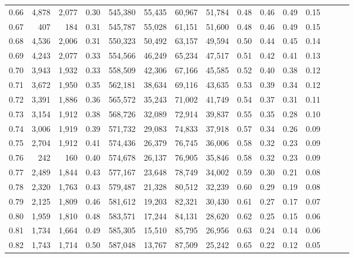 \begin{tabular}{rrrrrrrrrrrrrrr}
0.66 &   4,878 &  2,077 &  0.30 &  545,380 &   55,435 &   60,967 &   51,784 &  0.48 &  0.46 &  0.49 &      0.15 \\
0.67 &     407 &    184 &  0.31 &  545,787 &   55,028 &   61,151 &   51,600 &  0.48 &  0.46 &  0.49 &      0.15 \\
0.68 &   4,536 &  2,006 &  0.31 &  550,323 &   50,492 &   63,157 &   49,594 &  0.50 &  0.44 &  0.45 &      0.14 \\
0.69 &   4,243 &  2,077 &  0.33 &  554,566 &   46,249 &   65,234 &   47,517 &  0.51 &  0.42 &  0.41 &      0.13 \\
0.70 &   3,943 &  1,932 &  0.33 &  558,509 &   42,306 &   67,166 &   45,585 &  0.52 &  0.40 &  0.38 &      0.12 \\
0.71 &   3,672 &  1,950 &  0.35 &  562,181 &   38,634 &   69,116 &   43,635 &  0.53 &  0.39 &  0.34 &      0.12 \\
0.72 &   3,391 &  1,886 &  0.36 &  565,572 &   35,243 &   71,002 &   41,749 &  0.54 &  0.37 &  0.31 &      0.11 \\
0.73 &   3,154 &  1,912 &  0.38 &  568,726 &   32,089 &   72,914 &   39,837 &  0.55 &  0.35 &  0.28 &      0.10 \\
0.74 &   3,006 &  1,919 &  0.39 &  571,732 &   29,083 &   74,833 &   37,918 &  0.57 &  0.34 &  0.26 &      0.09 \\
0.75 &   2,704 &  1,912 &  0.41 &  574,436 &   26,379 &   76,745 &   36,006 &  0.58 &  0.32 &  0.23 &      0.09 \\
0.76 &     242 &    160 &  0.40 &  574,678 &   26,137 &   76,905 &   35,846 &  0.58 &  0.32 &  0.23 &      0.09 \\
0.77 &   2,489 &  1,844 &  0.43 &  577,167 &   23,648 &   78,749 &   34,002 &  0.59 &  0.30 &  0.21 &      0.08 \\
0.78 &   2,320 &  1,763 &  0.43 &  579,487 &   21,328 &   80,512 &   32,239 &  0.60 &  0.29 &  0.19 &      0.08 \\
0.79 &   2,125 &  1,809 &  0.46 &  581,612 &   19,203 &   82,321 &   30,430 &  0.61 &  0.27 &  0.17 &      0.07 \\
0.80 &   1,959 &  1,810 &  0.48 &  583,571 &   17,244 &   84,131 &   28,620 &  0.62 &  0.25 &  0.15 &      0.06 \\
0.81 &   1,734 &  1,664 &  0.49 &  585,305 &   15,510 &   85,795 &   26,956 &  0.63 &  0.24 &  0.14 &      0.06 \\
0.82 &   1,743 &  1,714 &  0.50 &  587,048 &   13,767 &   87,509 &   25,242 &  0.65 &  0.22 &  0.12 &      0.05 \\

\end{tabular}
